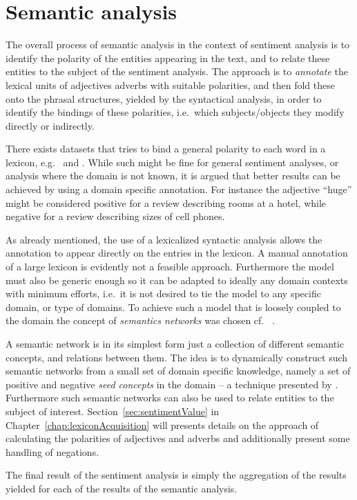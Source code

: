 \section{Semantic analysis}
\label{sec:semanticAnalysis}
The overall process of semantic analysis in the context of sentiment analysis is to identify the polarity of the entities appearing in the text, and to relate these entities to the subject of the sentiment analysis. The approach is to \emph{annotate} the lexical units of adjectives adverbs with suitable polarities, and then fold these onto the phrasal structures, yielded by the syntactical analysis, in order to identify the bindings of these polarities, i.e.\ which subjects/objects they modify directly or indirectly.

There exists datasets that tries to bind a general polarity to each word in a lexicon, e.g.\ \cite{sentiWordNet} and \cite{sentiWordNet3}. While such might be fine for general sentiment analyses, or analysis where the domain is not known, it is argued that better results can be achieved by using a domain specific annotation. For instance the adjective ``huge'' might be considered positive for a review describing rooms at a hotel, while negative for a review describing sizes of cell phones.

As already mentioned, the use of a lexicalized syntactic analysis allows the annotation to appear directly on the entries in the lexicon. A manual annotation of a large lexicon is evidently not a feasible approach. Furthermore the model must also be generic enough so it can be adapted to ideally any domain contexts with minimum efforts, i.e.\ it is not desired to tie the model to any specific domain, or type of domains. To achieve such a model that is loosely coupled to the domain the concept of \emph{semantics networks} was chosen cf.\ \citeauthor{ai} .

A semantic network is in its simplest form just a collection of different semantic concepts, and relations between them. The idea is to dynamically construct such semantic networks from a small set of domain specific knowledge, namely a set of positive and negative \emph{seed concepts} in the domain -- a technique presented by \citeauthor{valenceShifting} . Furthermore such semantic networks can also be used to relate entities to the subject of interest. Section~\ref{sec:sentimentValue} in Chapter~\ref{chap:lexiconAcquisition} will presents details on the approach of calculating the polarities of adjectives and adverbs and additionally present some handling of negations.

The final result of the sentiment analysis is simply the aggregation of the results yielded for each of the results of the semantic analysis.